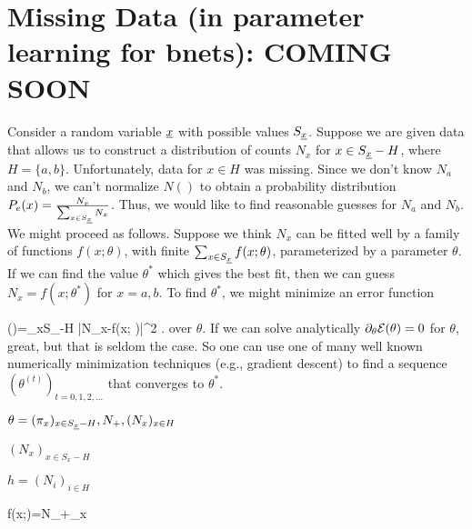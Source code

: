 \chapter{Missing Data
 (in parameter learning for bnets): COMING SOON}
\label{ch-missing-d}




Consider a random variable ${\underline{x}}$
with possible values $S_{\underline{x}}$.
Suppose we are given
data that allows us to construct
a distribution of counts
$N_x$
for $x\in S_{\underline{x}}-H$,
where $H=\{a,b\}$.
Unfortunately,
 data for $x\in H$
was missing.
Since we don't 
know $N_a$
and $N_b$,
we can't normalize
$N()$ to obtain
a probability distribution
$P_e(x)=\frac{N_x}
{\sum_{x\in S_{\underline{x}}}N_x}$.
Thus, we would
like to find 
reasonable guesses for $N_a$
and $N_b$.
We might proceed as follows.
Suppose we think
$N_x$ 
can be fitted well by
a family
of functions
$f(x;\theta)$,
with finite $\sum_{x\in S_{\underline{x}}}f(x;\theta)$,
parameterized by
a parameter $\theta$.
If we can find
the value $\theta^*$
which
gives the best fit,
then we can 
guess $N_x=f(x; \theta^*)$
for $x=a,b$.
To find $\theta^*$,
we might minimize
an error function

\beq
\cale(\theta)=\sum_{x\in S_\rvx-H}
|N_x-f(x; \theta)|^2
\;.
\eeq
over $\theta$.
If we can
solve analytically
$\partial_\theta {\cal E}(\theta)=0$
for $\theta$,
great, but that is seldom the case.
So one can use one
of many
well
known numerically
minimization
techniques (e.g., 
gradient descent)
to find 
a sequence
$(\theta^{(t)})_{t=0, 1, 2, \ldots}$
that converges to $\theta^*$.


$\theta= (\pi_x)_{x\in S_{\underline{x}}-H}, N_+, (N_x)_{x\in H}$

$(N_x)_{x\in S_x-H}$

$h=(N_i)_{i\in H}$

\beq
f(x;\theta)=N_+\pi_x
\eeq

